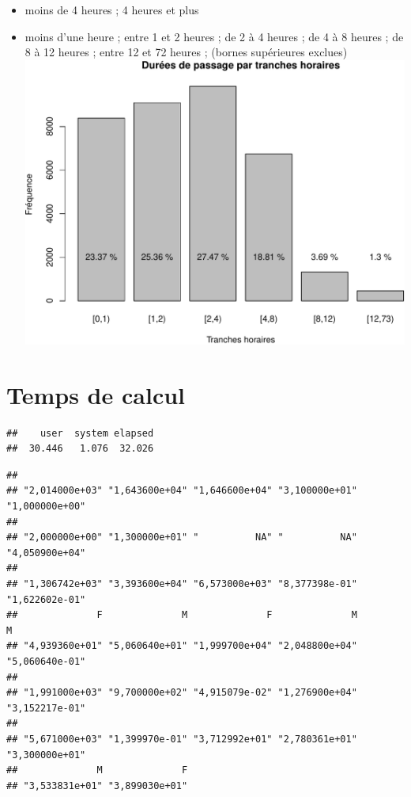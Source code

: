 \documentclass[]{article}
\begin{document}
\begin{itemize}
\itemsep1pt\parskip0pt
\item
  moins de 4 heures ; 4 heures et plus
\item
  moins d'une heure ; entre 1 et 2 heures ; de 2 à 4 heures ; de 4 à 8
  heures ; de 8 à 12 heures ; entre 12 et 72 heures ; (bornes
  supérieures exclues)
  \includegraphics{rapport_2014_files/figure-latex/duree_tranches_horaires-1.pdf}
\end{itemize}

\section{Temps de calcul}\label{temps-de-calcul}

\begin{verbatim}
##    user  system elapsed 
##  30.446   1.076  32.026
\end{verbatim}

\begin{verbatim}
##                                                                            
## "2,014000e+03" "1,643600e+04" "1,646600e+04" "3,100000e+01" "1,000000e+00" 
##                                                                            
## "2,000000e+00" "1,300000e+01" "          NA" "          NA" "4,050900e+04" 
##                                                                            
## "1,306742e+03" "3,393600e+04" "6,573000e+03" "8,377398e-01" "1,622602e-01" 
##              F              M              F              M              M 
## "4,939360e+01" "5,060640e+01" "1,999700e+04" "2,048800e+04" "5,060640e-01" 
##                                                                            
## "1,991000e+03" "9,700000e+02" "4,915079e-02" "1,276900e+04" "3,152217e-01" 
##                                                                            
## "5,671000e+03" "1,399970e-01" "3,712992e+01" "2,780361e+01" "3,300000e+01" 
##              M              F 
## "3,533831e+01" "3,899030e+01"
\end{verbatim}
\end{document}
